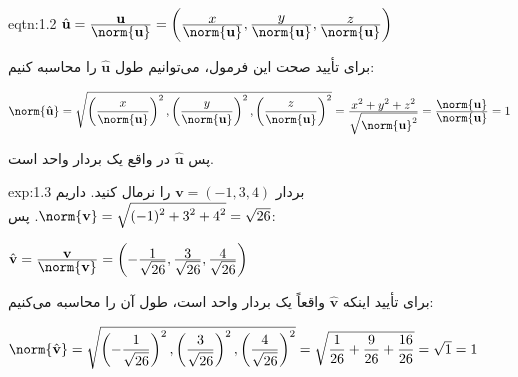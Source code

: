 {\begin{spacing}{1.5}
        \begin{eqtn}{eqtn:1.2}
            \centering
            $\hat{\textbf{u}}=\frac{\displaystyle\textbf{u}}{\displaystyle\norm{\textbf{u}}}=\left(\frac{\displaystyle x}{\displaystyle\norm{\textbf{u}}},
            \frac{\displaystyle y}{\displaystyle\norm{\textbf{u}}}, \frac{\displaystyle z}{\displaystyle\norm{\textbf{u}}}\right)$
        \end{eqtn}

        برای تأیید صحت این فرمول، می‌توانیم طول $\hat{\textbf{u}}$ را محاسبه کنیم:

        \begin{center}
            $\norm{\hat{\textbf{u}}}=\sqrt{\displaystyle \left(\frac{\displaystyle x}{\displaystyle\norm{\textbf{u}}}\right)^2,
                \left(\frac{\displaystyle y}{\displaystyle\norm{\textbf{u}}}\right)^2,
                \left(\frac{\displaystyle z}{\displaystyle\norm{\textbf{u}}}\right)^2}=\frac{\displaystyle x^2+y^2+z^2}{\displaystyle\sqrt{\displaystyle \norm{\textbf{u}}^2}}
            =\frac{\displaystyle\norm{\textbf{u}}}{\displaystyle\norm{\textbf{u}}}=1$
        \end{center}

        پس $\hat{\textbf{u}}$ در واقع یک بردار واحد است.

        \begin{example}{exp:1.3}
            بردار $\textbf{v}=(-1,3,4)$ را نرمال کنید. داریم $\norm{\textbf{v}}=\sqrt{\displaystyle (-1)^2+3^2+4^2}=\sqrt{\displaystyle 26}$. پس:

            \begin{center}
                $\hat{\textbf{v}}=\frac{\displaystyle\textbf{v}}{\displaystyle\norm{\textbf{v}}}=\left(-\frac{\displaystyle 1}{\displaystyle\sqrt{\displaystyle 26}},
                \frac{\displaystyle 3}{\displaystyle\sqrt{\displaystyle 26}}, \frac{\displaystyle 4}{\displaystyle\sqrt{\displaystyle 26}}\right)$
            \end{center}

            برای تأیید اینکه $\hat{\textbf{v}}$ واقعاً یک بردار واحد است، طول آن را محاسبه می‌کنیم:

            \begin{center}
                $\norm{\hat{\textbf{v}}}=\sqrt{\displaystyle \left(-\frac{\displaystyle 1}{\displaystyle\sqrt{\displaystyle 26}}\right)^2,
                    \left(\frac{\displaystyle 3}{\displaystyle\sqrt{\displaystyle 26}}\right)^2, \left(\frac{\displaystyle 4}{\displaystyle\sqrt{\displaystyle 26}}\right)^2}=
                \sqrt{\displaystyle\frac{\displaystyle 1}{\displaystyle 26}+\frac{\displaystyle 9}{\displaystyle 26}+\frac{\displaystyle 16}{\displaystyle 26}}=\sqrt{\displaystyle 1}=1$
            \end{center}
        \end{example}
    \end{spacing}
}


